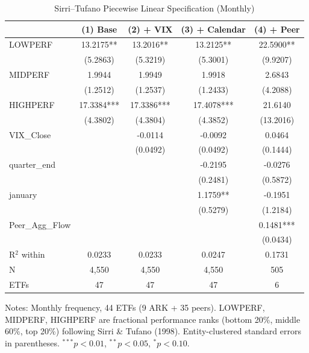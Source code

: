 \begin{table}[htbp]\centering
\caption{Sirri--Tufano Piecewise Linear Specification (Monthly)}
\label{tab:sirri_tufano}
\begin{tabular}{lcccc}
\toprule
 & (1) Base & (2) + VIX & (3) + Calendar & (4) + Peer \\
\midrule
LOWPERF & 13.2175** & 13.2016** & 13.2125** & 22.5900** \\
 & (5.2863) & (5.3219) & (5.3001) & (9.9207) \\[3pt]
MIDPERF & 1.9944 & 1.9949 & 1.9918 & 2.6843 \\
 & (1.2512) & (1.2537) & (1.2433) & (4.2088) \\[3pt]
HIGHPERF & 17.3384*** & 17.3386*** & 17.4078*** & 21.6140 \\
 & (4.3802) & (4.3804) & (4.3852) & (13.2016) \\[3pt]
VIX\_Close &  & -0.0114 & -0.0092 & 0.0464 \\
 &  & (0.0492) & (0.0492) & (0.1444) \\[3pt]
quarter\_end &  &  & -0.2195 & -0.0276 \\
 &  &  & (0.2481) & (0.5872) \\[3pt]
january &  &  & 1.1759** & -0.1951 \\
 &  &  & (0.5279) & (1.2184) \\[3pt]
Peer\_Agg\_Flow &  &  &  & 0.1481*** \\
 &  &  &  & (0.0434) \\[3pt]
\midrule
R$^2$ within & 0.0233 & 0.0233 & 0.0247 & 0.1731 \\
N & 4,550 & 4,550 & 4,550 & 505 \\
ETFs & 47 & 47 & 47 & 6 \\
\bottomrule
\end{tabular}
\begin{tablenotes}\small
\item Notes: Monthly frequency, 44 ETFs (9 ARK + 35 peers).
LOWPERF, MIDPERF, HIGHPERF are fractional performance ranks
(bottom 20\%, middle 60\%, top 20\%) following Sirri \& Tufano (1998).
Entity-clustered standard errors in parentheses.
$^{***}p<0.01$, $^{**}p<0.05$, $^{*}p<0.10$.
\end{tablenotes}
\end{table}